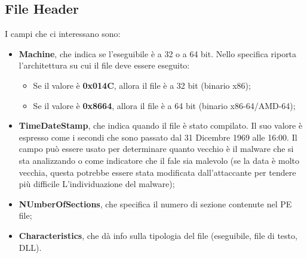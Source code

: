 \documentclass[a4paper]{book}
\begin{document}
\subsection{File Header}
I campi che ci interessano sono:
\begin{itemize}
    \item \textbf{Machine}, che indica se l'eseguibile è a 32 o a 64 bit. Nello specifica riporta l'architettura su cui il file deve essere eseguito:
    \begin{itemize}
        \item Se il valore è \textbf{0x014C}, allora il file è a 32 bit (binario x86);
        \item Se il valore è \textbf{0x8664}, allora il file è a 64 bit (binario x86-64/AMD-64);
    \end{itemize}
    \item \textbf{TimeDateStamp}, che indica quando il file è stato compilato. Il suo valore è espresso come i secondi che sono passato dal 31 Dicembre 1969 alle 16:00. Il campo può essere usato per determinare quanto vecchio è il malware che si sta analizzando o come indicatore che il fale sia malevolo (se la data è molto vecchia, questa potrebbe essere stata modificata dall'attaccante per tendere più difficile L'individuazione del malware);
    \item\textbf{NUmberOfSections}, che specifica il numero di sezione contenute nel PE file;
    \item \textbf{Characteristics}, che dà info sulla tipologia del file (eseguibile, file di testo, DLL).
\end{itemize}
\end{document}
